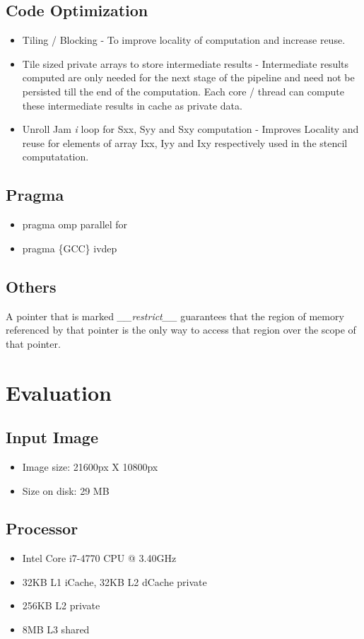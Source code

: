 \documentclass[]{article}
\begin{document}
\subsection{Code Optimization}
\begin{itemize}
\item Tiling / Blocking - To improve locality of computation and increase reuse.
\item Tile sized private arrays to store intermediate results - Intermediate results computed are only needed for the next stage of the pipeline and need not be persisted till the end of the computation. Each core / thread can compute these intermediate results in cache as private data.
\item Unroll Jam \textit{i} loop for Sxx, Syy and Sxy computation - Improves Locality and reuse for elements of array Ixx, Iyy and Ixy respectively used in the stencil computatation.
\end{itemize}

\subsection{Pragma}
\begin{itemize}
\item pragma omp parallel for
\item pragma \{GCC\} ivdep
\end{itemize}

\subsection{Others}
A pointer that is marked \textit{\_\_restrict\_\_} guarantees that the region of memory referenced by that pointer is the only way to access that region over the scope of that pointer.
\section{Evaluation}
\subsection{Input Image}
\begin{itemize}
\item Image size: 21600px X 10800px
\item Size on disk: 29 MB
\end{itemize}

\subsection{Processor}
\begin{itemize}
\item Intel Core i7-4770 CPU @ 3.40GHz
\item 32KB L1 iCache, 32KB L2 dCache private
\item 256KB L2 private
\item 8MB L3 shared
\end{itemize}
\end{document}
